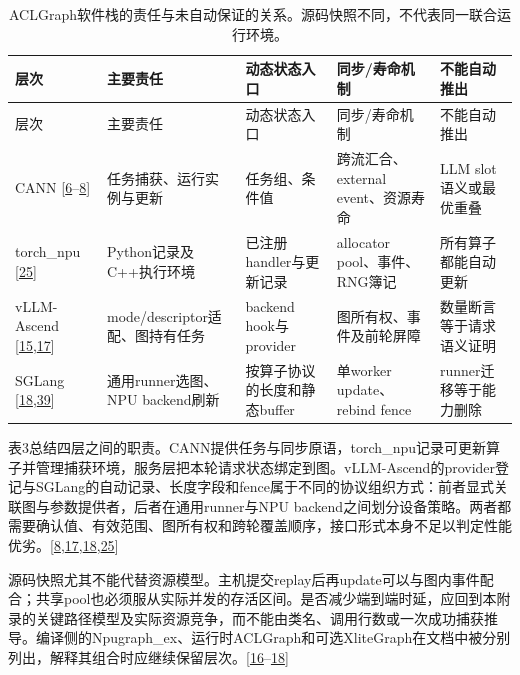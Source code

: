 \documentclass[
  UTF8,
  zihao=5]{ctexart}
\begin{document}
\begin{longtable}[]{@{}
  >{\raggedright\arraybackslash}p{}
  >{\raggedright\arraybackslash}p{}
  >{\raggedright\arraybackslash}p{}
  >{\raggedright\arraybackslash}p{}
  >{\raggedright\arraybackslash}p{}@{}}
\caption{ACLGraph软件栈的责任与未自动保证的关系。源码快照不同，不代表同一联合运行环境。}\tabularnewline
\toprule
层次 & 主要责任 & 动态状态入口 & 同步/寿命机制 & 不能自动推出 \\
\midrule
\endfirsthead
\toprule
层次 & 主要责任 & 动态状态入口 & 同步/寿命机制 & 不能自动推出 \\
\midrule
\endhead
CANN
{[}\protect\hyperlink{ref-cann910single}{6}--\protect\hyperlink{ref-cann910update}{8}{]}
& 任务捕获、运行实例与更新 & 任务组、条件值 & 跨流汇合、external
event、资源寿命 & LLM slot语义或最优重叠 \\
torch\_npu {[}\protect\hyperlink{ref-torchnpu2026graphs}{25}{]} &
Python记录及C++执行环境 & 已注册handler与更新记录 & allocator
pool、事件、RNG簿记 & 所有算子都能自动更新 \\
vLLM-Ascend
{[}\protect\hyperlink{ref-vllmascenddesign}{15},\protect\hyperlink{ref-vllmascend2026impl}{17}{]}
& mode/descriptor适配、图持有任务 & backend hook与provider &
图所有权、事件及前轮屏障 & 数量断言等于请求语义证明 \\
SGLang
{[}\protect\hyperlink{ref-sglang2026impl}{18},\protect\hyperlink{ref-sglang2026refactor}{39}{]}
& 通用runner选图、NPU backend刷新 & 按算子协议的长度和静态buffer &
单worker update、rebind fence & runner迁移等于能力删除 \\
\bottomrule
\end{longtable}

表3总结四层之间的职责。CANN提供任务与同步原语，torch\_npu记录可更新算子并管理捕获环境，服务层把本轮请求状态绑定到图。vLLM-Ascend的provider登记与SGLang的自动记录、长度字段和fence属于不同的协议组织方式：前者显式关联图与参数提供者，后者在通用runner与NPU
backend之间划分设备策略。两者都需要确认值、有效范围、图所有权和跨轮覆盖顺序，接口形式本身不足以判定性能优劣。{[}\protect\hyperlink{ref-cann910update}{8},\protect\hyperlink{ref-vllmascend2026impl}{17},\protect\hyperlink{ref-sglang2026impl}{18},\protect\hyperlink{ref-torchnpu2026graphs}{25}{]}

源码快照尤其不能代替资源模型。主机提交replay后再update可以与图内事件配合；共享pool也必须服从实际并发的存活区间。是否减少端到端时延，应回到本附录的关键路径模型及实际资源竞争，而不能由类名、调用行数或一次成功捕获推导。编译侧的Npugraph\_ex、运行时ACLGraph和可选XliteGraph在文档中被分别列出，解释其组合时应继续保留层次。{[}\protect\hyperlink{ref-vllmascendmode}{16}--\protect\hyperlink{ref-sglang2026impl}{18}{]}
\end{document}
